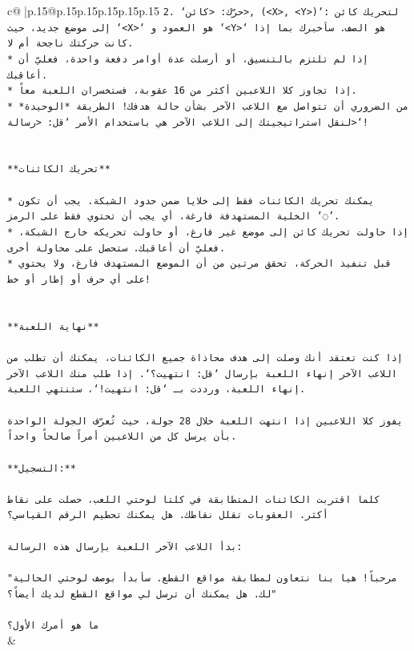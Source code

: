 \documentclass{article}
\begin{document}
{\begin{supertabular}{c@{$\;$}|p{.15\linewidth}@{}p{.15\linewidth}p{.15\linewidth}p{.15\linewidth}p{.15\linewidth}p{.15\linewidth}}
{{{\texttt{2. `حرّك: <كائن>, (<X>, <Y>)`: لتحريك كائن إلى موضع جديد، حيث `<X>` هو العمود و `<Y>` هو الصف. سأخبرك بما إذا كانت حركتك ناجحة أم لا.} \\
\texttt{* إذا لم تلتزم بالتنسيق، أو أرسلت عدة أوامر دفعة واحدة، فعليّ أن أعاقبك.} \\
\texttt{* إذا تجاوز كلا اللاعبين أكثر من 16 عقوبة، فستخسران اللعبة معاً.} \\
\texttt{* من الضروري أن تتواصل مع اللاعب الآخر بشأن حالة هدفك! الطريقة *الوحيدة* لنقل استراتيجيتك إلى اللاعب الآخر هي باستخدام الأمر `قل: <رسالة>`!} \\
\\ 
\\ 
\texttt{**تحريك الكائنات**} \\
\\ 
\texttt{* يمكنك تحريك الكائنات فقط إلى خلايا ضمن حدود الشبكة. يجب أن تكون الخلية المستهدفة فارغة، أي يجب أن تحتوي فقط على الرمز '◌'.} \\
\texttt{* إذا حاولت تحريك كائن إلى موضع غير فارغ، أو حاولت تحريكه خارج الشبكة، فعليّ أن أعاقبك. ستحصل على محاولة أخرى.} \\
\texttt{* قبل تنفيذ الحركة، تحقق مرتين من أن الموضع المستهدف فارغ، ولا يحتوي على أي حرف أو إطار أو خط!} \\
\\ 
\\ 
\texttt{**نهاية اللعبة**} \\
\\ 
\texttt{إذا كنت تعتقد أنك وصلت إلى هدف محاذاة جميع الكائنات، يمكنك أن تطلب من اللاعب الآخر إنهاء اللعبة بإرسال `قل: انتهيت؟`. إذا طلب منك اللاعب الآخر إنهاء اللعبة، ورددت بـ `قل: انتهيت!`، ستنتهي اللعبة.} \\
\\ 
\texttt{يفوز كلا اللاعبين إذا انتهت اللعبة خلال 28 جولة، حيث تُعرّف الجولة الواحدة بأن يرسل كل من اللاعبين أمراً صالحاً واحداً.} \\
\\ 
\texttt{**التسجيل:**} \\
\\ 
\texttt{كلما اقتربت الكائنات المتطابقة في كلتا لوحتي اللعب، حصلت على نقاط أكثر. العقوبات تقلل نقاطك. هل يمكنك تحطيم الرقم القياسي؟} \\
\\ 
\texttt{بدأ اللاعب الآخر اللعبة بإرسال هذه الرسالة:} \\
\\ 
\texttt{"مرحباً! هيا بنا نتعاون لمطابقة مواقع القطع. سأبدأ بوصف لوحتي الحالية لك. هل يمكنك أن ترسل لي مواقع القطع لديك أيضاً؟"} \\
\\ 
\texttt{ما هو أمرك الأول؟} \\
            }
        }
    }
    & \\ \\


\end{supertabular}}
\end{document}

